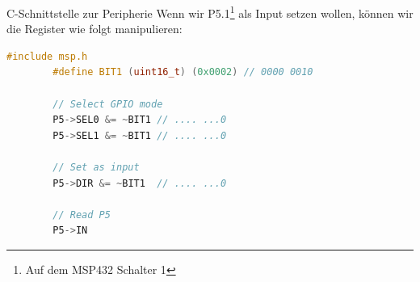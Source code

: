 \begin{example}{C-Schnittstelle zur Peripherie}
    Wenn wir P5.1\footnote{Auf dem MSP432 Schalter 1} als Input setzen wollen, können wir die Register wie folgt manipulieren:

    \begin{lstlisting}[language=c]
        #include msp.h
        #define BIT1 (uint16_t) (0x0002) // 0000 0010

        // Select GPIO mode
        P5->SEL0 &= ~BIT1 // .... ...0
        P5->SEL1 &= ~BIT1 // .... ...0

        // Set as input
        P5->DIR &= ~BIT1  // .... ...0

        // Read P5
        P5->IN
    \end{lstlisting}
\end{example}
